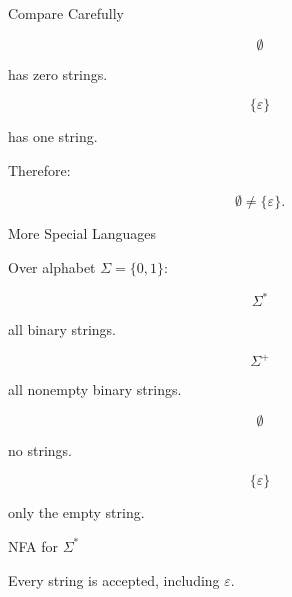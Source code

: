 \documentclass[10pt,aspectratio=169]{beamer}
\newcommand{\eps}{\varepsilon}
\begin{document}
\begin{frame}{Compare Carefully}

\[
\emptyset
\]

has zero strings.

\vspace{1em}

\[
\{\eps\}
\]

has one string.

\vspace{1em}

\pause

Therefore:

\[
\emptyset\neq \{\eps\}.
\]

\end{frame}

\begin{frame}{More Special Languages}

Over alphabet \(\Sigma=\{0,1\}\):

\[
\Sigma^*
\]

all binary strings.

\vspace{0.5em}

\[
\Sigma^+
\]

all nonempty binary strings.

\vspace{0.5em}

\[
\emptyset
\]

no strings.

\vspace{0.5em}

\[
\{\eps\}
\]

only the empty string.

\end{frame}

\begin{frame}{NFA for \(\Sigma^*\)}

\begin{center}
\end{center}

\vspace{1em}

Every string is accepted, including \(\eps\).

\end{frame}
\end{document}
